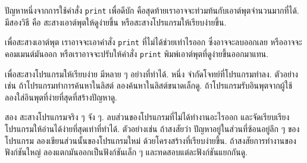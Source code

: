 
ปัญหาหนึ่งจากการใช้คำสั่ง \texttt{print}
เพื่อดีบัก คือสุดท้ายเราอาจจะท่วมท้นกับเอาต์พุตจำนวนมากที่ได้.
มีสองวิธี คือ
สะสางเอาต์พุตให้ดูง่ายขึ้น หรือสะสางโปรแกรมให้เรียบง่ายขึ้น.


เพื่อสะสางเอาต์พุต
เราอาจจะเอาคำสั่ง \texttt{print} ที่ไม่ได้ช่วยเท่าไรออก 
ซึ่งอาจจะลบออกเลย หรืออาจจะคอมเมนต์มันออก
หรือเราอาจจะปรับให้คำสั่ง \texttt{print}
พิมพ์เอาต์พุตที่ดูง่ายขึ้นออกมาแทน.


เพื่อสะสางโปรแกรมให้เรียบง่าย
มีหลาย ๆ อย่างที่ทำได้.
หนึ่ง
จำกัดโจทย์ที่โปรแกรมทำลง.
ตัวอย่างเช่น 
ถ้าโปรแกรมทำการค้นหาในลิสต์
ลองค้นหาในลิสต์ขนาดเล็กดู.
ถ้าโปรแกรมรับอินพุตจากผู้ใช้
ลองใส่อินพุตที่ง่ายที่สุดที่สร้างปัญหาดู.


สอง
สะสางโปรแกรมจริง ๆ จัง ๆ.
ลบส่วนของโปรแกรมที่ไม่ได้ทำงานอะไรออก
และจัดเรียบเรียงโปรแกรมให้อ่านได้ง่ายที่สุดเท่าที่ทำได้.
ตัวอย่างเช่น 
ถ้าสงสัยว่า ปัญหาอยู่ในส่วนที่ซ้อนอยู่ลึก ๆ ของโปรแกรม
ลองเขียนส่วนนั้นของโปรแกรมใหม่ ด้วยโครงสร้างที่เรียบง่ายขึ้น.
ถ้าสงสัยการทำงานของฟังก์ชันใหญ่
ลองแตกมันออกเป็นฟังก์ชันเล็ก ๆ  และทดสอบแต่ละฟังก์ชันแยกกันดู.



